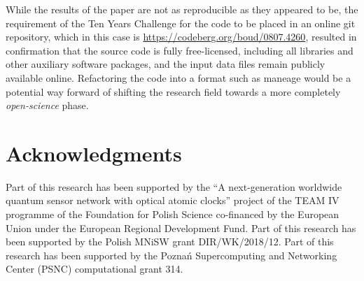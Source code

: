 While the results of the paper are not as reproducible as they
appeared to be, the requirement of the Ten Years Challenge
for the code to be placed in an online git repository,
which in this case is \url{https://codeberg.org/boud/0807.4260},
resulted in confirmation that the source code is
fully free-licensed, including all libraries and other
auxiliary software packages, and the input data files
remain publicly available online. Refactoring the code into a
format such as {\sc maneage}\supercite{Akhlaghi2020} would be a
potential way forward of shifting the research field towards
a more completely \emph{open-science} phase.

\section*{Acknowledgments}
{\footnotesize Part of this research has been supported by
  the ``A next-generation worldwide quantum sensor network with optical atomic clocks'' project of the TEAM IV programme of the Foundation for Polish Science co-financed by the European Union under the European Regional Development Fund.
  Part of this research has been supported by
  the Polish MNiSW grant DIR/WK/2018/12.
  Part of this research has been supported by
  the Pozna\'n Supercomputing and Networking Center (PSNC) computational grant 314.}
